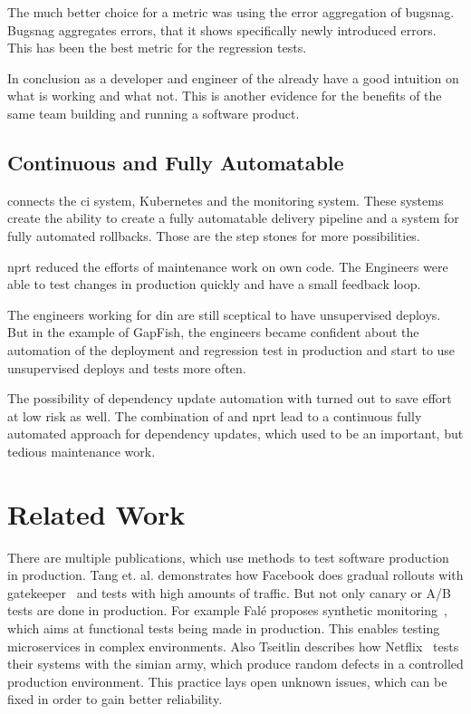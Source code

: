 The much better choice for a metric was using the error aggregation of bugsnag. Bugsnag
aggregates errors, that it shows specifically newly introduced errors. This has been the
best metric for the regression tests.


In conclusion as a developer and engineer of the already have a good intuition on what is
working and what not. This is another evidence for the benefits of the same team building
and running a software product.

\subsection{Continuous and Fully Automatable}

\deployer connects the \gls{ci} system, Kubernetes and the monitoring system. These systems
create the ability to create a fully automatable delivery pipeline and a system for fully
automated rollbacks. Those are the step stones for more possibilities.

\gls{nprt} reduced the efforts of maintenance work on own code. The Engineers were able to
test changes in production quickly and have a small feedback loop.

The engineers working for \gls{din} are still sceptical to have unsupervised deploys. But in the
example of GapFish, the engineers became confident about the automation of the deployment
and regression test in production and start to use unsupervised deploys and tests more often.

The possibility of dependency update automation with \gemupdater turned out to save effort
at low risk as well. The combination of \gemupdater and \gls{nprt} lead to a continuous
fully automated approach for dependency updates, which used to be an important, but
tedious maintenance work.

\section{Related Work}

There are multiple publications, which use methods to test software production in
production. Tang et. al. demonstrates how Facebook does gradual rollouts with
gatekeeper~\cite{fb_config_management} and tests with high amounts of traffic. But not
only canary or A/B tests are done in production. For example Falé proposes synthetic
monitoring~\cite{synthmonitoring}, which aims at functional tests being made in
production. This enables testing microservices in complex environments. Also Tseitlin
describes how Netflix~\cite{antifragile_org} tests their systems with the simian army,
which produce random defects in a controlled production environment. This practice lays
open unknown issues, which can be fixed in order to gain better reliability.

